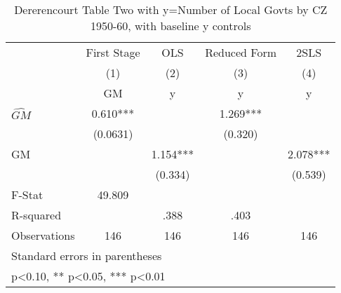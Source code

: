 \begin{table}[htbp]\centering
\def\sym#1{\ifmmode^{#1}\else\(^{#1}\)\fi}
\caption{Dererencourt Table Two with y=Number of Local Govts by CZ 1950-60, with baseline y controls}
\begin{tabular}{l*{4}{c}}
\toprule
                    & First Stage   &         OLS   &Reduced Form   &        2SLS   \\
                    &\multicolumn{1}{c}{(1)}&\multicolumn{1}{c}{(2)}&\multicolumn{1}{c}{(3)}&\multicolumn{1}{c}{(4)}\\
                    &\multicolumn{1}{c}{GM}&\multicolumn{1}{c}{y}&\multicolumn{1}{c}{y}&\multicolumn{1}{c}{y}\\
\midrule
$\hat{GM}$          &       0.610***&               &       1.269***&               \\
                    &    (0.0631)   &               &     (0.320)   &               \\
\addlinespace
GM                  &               &       1.154***&               &       2.078***\\
                    &               &     (0.334)   &               &     (0.539)   \\
\midrule
F-Stat              &      49.809   &               &               &               \\
R-squared           &               &        .388   &        .403   &               \\
Observations        &         146   &         146   &         146   &         146   \\
\bottomrule
\multicolumn{5}{l}{\footnotesize Standard errors in parentheses}\\
\multicolumn{5}{l}{\footnotesize * p<0.10, ** p<0.05, *** p<0.01}\\
\end{tabular}
\end{table}
